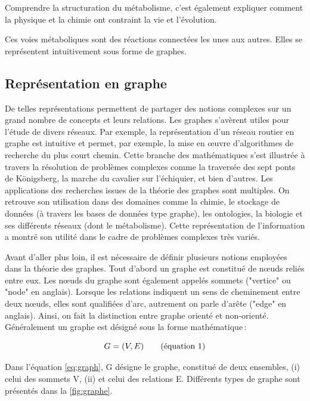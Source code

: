 \begin{refsegment}
    Comprendre la structuration du métabolisme, c'est également expliquer comment la physique et la chimie ont contraint la vie et l'évolution.
    
    Ces voies métaboliques sont des réactions connectées les unes aux autres. Elles se représentent intuitivement sous forme de graphes.
    
    \subsection{Représentation en graphe}
    
    De telles représentations permettent de partager des notions complexes sur un grand nombre de concepts et leurs relations. Les graphes s'avèrent utiles pour l'étude de divers réseaux. Par exemple, la représentation d’un réseau routier en graphe est intuitive et permet, par exemple, la mise en œuvre d'algorithmes de recherche du plus court chemin. Cette branche des mathématiques s'est illustrée à travers la résolution de problèmes complexes comme la traversée des sept ponts de Königsberg, la marche du cavalier sur l’échiquier, et bien d'autres. Les applications des recherches issues de la théorie des graphes sont multiples. On retrouve son utilisation dans des domaines comme la chimie, le stockage de données (à travers les bases de données type graphe), les ontologies, la biologie et ses différents réseaux (dont le métabolisme). Cette représentation de l'information a montré son utilité dans le cadre de problèmes complexes très variés.
    
    Avant d'aller plus loin, il est nécessaire de définir plusieurs notions employées dans la théorie des graphes. Tout d'abord un graphe est constitué de nœuds reliés entre eux. Les nœuds du graphe sont également appelés sommets ("vertice" ou "node" en anglais).  Lorsque les relations indiquent un sens de cheminement entre deux nœuds, elles sont qualifiées d'arc, autrement on parle d'arête ("edge" en anglais). Ainsi, on fait la distinction entre graphe orienté et non-orienté. Généralement un graphe est désigné sous la forme mathématique :
    
    \begin{equation}\label{eq:graph}
    	G = (V,E) \stepcounter{equation}\tag{équation \theequation}
    \end{equation}
    
    Dans l'équation \ref{eq:graph}, G désigne le graphe, constitué de deux ensembles, (i) celui des sommets V, (ii) et celui des relations E. Différents types de graphe sont présentés dans la \cref{fig:graphe}.
    

\end{refsegment}
